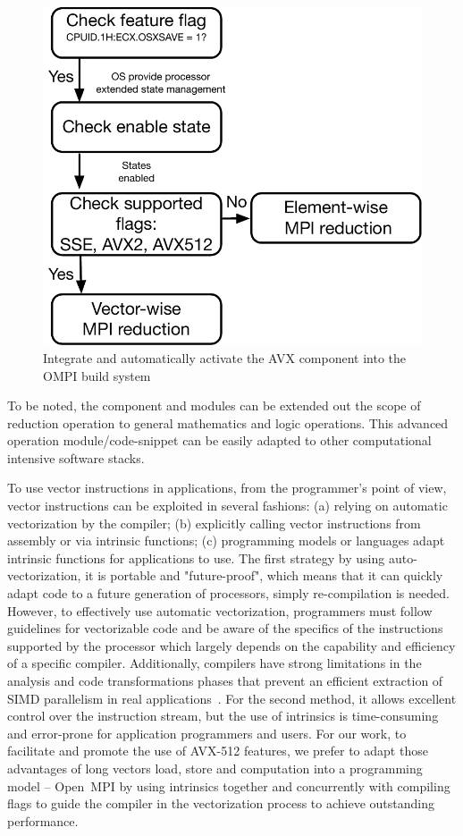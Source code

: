 \documentclass[sigconf]{acmart}
\newcommand{\ompi}[0]{Open~MPI\xspace}
\begin{document}
\begin{figure}[h]
    \centering
    \includegraphics[scale=.45]{avx-graph.pdf}
    \caption{Integrate and automatically activate the AVX component into the OMPI build system}
    \label{fig:512flow}
\end{figure}

To be noted, the component and modules can be
extended out the scope of reduction operation to general mathematics and logic operations.
This advanced operation module/code-snippet can be easily adapted to other computational intensive software stacks.

To use vector instructions in applications, from the programmer's point of view,
vector instructions can be exploited in several fashions: (a) relying on automatic vectorization by the
compiler; (b) explicitly calling vector
instructions from assembly or via intrinsic functions; (c) programming models or languages adapt
intrinsic functions for applications to use.
The first strategy by using auto-vectorization,
it is portable and "future-proof", which means that it can quickly adapt code to
a future generation of processors, simply re-compilation is needed. However,
to effectively use automatic vectorization, programmers must follow
guidelines for vectorizable code and be aware of the specifics of the instructions supported
by the processor which largely depends on the capability and efficiency of a specific compiler.
Additionally, compilers have strong limitations in the analysis and code transformations phases
that prevent an efficient extraction of SIMD parallelism in real applications~\cite{auto_Evaluation}.
For the second method, it allows excellent control over the instruction stream, but the use of
intrinsics is time-consuming and error-prone for application programmers and users.
For our work, to facilitate and promote the use of AVX-512 features, we
prefer to adapt those advantages of long vectors load, store and computation
into a programming model --  \ompi by using intrinsics together and concurrently with compiling flags
to guide the compiler in the vectorization process to achieve outstanding performance.
\end{document}
